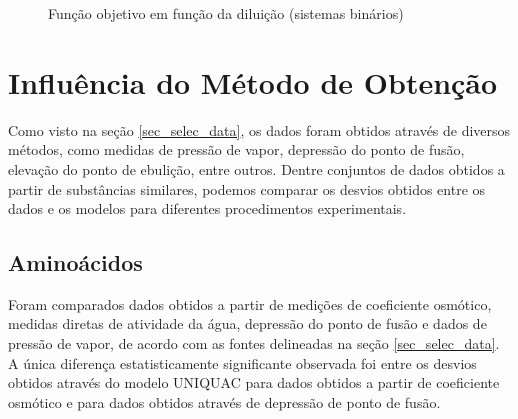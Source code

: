 \documentclass[
	12pt,				%
	openright,
	twoside,
	a4paper,			%
	english,			%
	french,				%
	spanish,			%
	brazil				%
	]{abntex2}
\begin{document}
\begin{figure}[h]
	\centering
	\caption{Função objetivo em função da diluição (sistemas binários)}
	\label{fig_dilution_all}
\end{figure}


\section{Influência do Método de Obtenção}

Como visto na seção \ref{sec_selec_data}, os dados foram obtidos através de
diversos métodos, como medidas de pressão de vapor, depressão do ponto de fusão,
elevação do ponto de ebulição, entre outros. Dentre conjuntos de dados obtidos
a partir de substâncias similares, podemos comparar os desvios obtidos entre os
dados e os modelos para diferentes procedimentos experimentais.

\subsection{Aminoácidos}

Foram comparados dados obtidos a partir de medições de coeficiente osmótico,
medidas diretas de atividade da água, depressão do ponto de fusão e dados de
pressão de vapor, de acordo com as fontes delineadas na seção \ref{sec_selec_data}.
A única diferença estatisticamente significante observada foi entre os desvios
obtidos através do modelo UNIQUAC para dados obtidos a partir de coeficiente
osmótico e para dados obtidos através de depressão de ponto de fusão.
\end{document}
